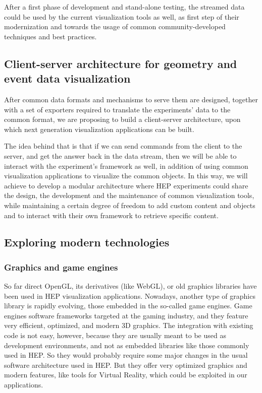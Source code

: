 \documentclass[12pt,a4paper]{article}
\begin{document}
After a first phase of development and stand-alone testing, the streamed data could be used by the current visualization tools as well,
as first step of their modernization and towards the usage of common community-developed techniques and best practices.

\hypertarget{client-server}{%
\subsection{Client-server architecture for geometry and event data visualization}\label{client-server}}

After common data formats and mechanisms to serve them are designed, together with a set of exporters required to translate the experiments’
data to the common format, we are proposing to build a client-server architecture, upon which next generation visualization applications can be built.

The idea behind that is that if we can send commands from the client to the server, and get the answer back in the data stream, then
we will be able to interact with the experiment’s framework as well, in addition of using common visualization applications to visualize
the common objects. In this way, we will achieve to develop a modular architecture where HEP experiments could share the design, the
development and the maintenance of common visualization tools, while maintaining a certain degree of freedom to add custom content
and objects and to interact with their own framework to retrieve specific content.

\hypertarget{modern-tech}{%
\subsection{Exploring modern technologies}\label{modern-tech}}

\hypertarget{graphic-engines}{%
\subsubsection{Graphics and game engines}\label{graphic-engines}}

So far direct OpenGL, its derivatives (like WebGL), or old graphics libraries have been used in HEP visualization applications. Nowadays,
another type of graphics library is rapidly evolving, those embedded in the so-called game engines. Game engines software frameworks targeted
at the gaming industry, and they feature very efficient, optimized, and modern 3D graphics.
The integration with existing code is not easy, however, because they are usually meant to be used as development environments,
and not as embedded libraries like those commonly used in HEP. So they would probably require some major changes in the usual
software architecture used in HEP. But they offer very optimized graphics and modern features, like tools for Virtual Reality,
which could be exploited in our applications.
\end{document}
